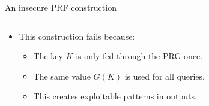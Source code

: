\documentclass[aspectratio=169, lualatex, handout]{beamer}
\begin{document}
\begin{frame}{An insecure PRF construction}
	\begin{columns}[c]
		\begin{column}{0.45\textwidth}
			\begin{itemize}
				\item This construction fails because:
				      \begin{itemize}
					      \item The key $K$ is only fed through the PRG once.
					      \item The same value $G(K)$ is used for all queries.
					      \item This creates exploitable patterns in outputs.
				      \end{itemize}
			\end{itemize}
		\end{column}
		\begin{column}{0.55\textwidth}
			\begin{center}
			\end{center}
		\end{column}
	\end{columns}
\end{frame}
\end{document}
